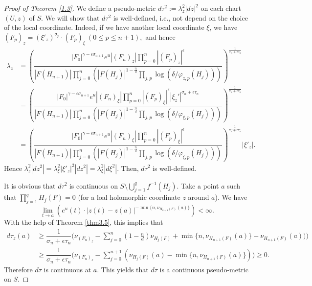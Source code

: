 \documentclass[12pt,article]{amsart}
\numberwithin{equation}{section}
\begin{document}
\begin{proof}[Proof of Theorem \ref{1.3}]
We define a pseudo-metric $d\tau^2:=\lambda_z^2|dz|^2$ on each chart $(U,z)$ of $S$. We will show that $d\tau^2$ is well-defined, i.e., not depend on the choice of the local coordinate. Indeed, if we have another local coordinate $\xi$, we have
$(F_p)_z=(\xi'_z)^{\sigma_p}\cdot (F_p)_\xi\ (0\leq p\le n+1),$ and hence
\begin{align*}
\lambda_{z}&=\left( \dfrac{|F_{0}|^{\gamma-\epsilon\sigma_{n+1}}e^u|(F_n)_z|\prod_{p=0}^{n}|(F_p)_z|^{\epsilon}}{|F(H_{n+1})|\prod_{j=0}^n(|F(H_j)|^{1-\frac{n}{d}}\prod_{j,p}\log (\delta/\varphi_{z,p}(H_j)))}\right )^{\frac{1}{\sigma_n+\epsilon\tau_n}}\\
    &=\left( \dfrac{|F_0|^{\gamma-\epsilon\sigma_{n+1}} e^u|(F_n)_\xi|\prod_{p=0}^{n}|(F_p)_\xi|^{\epsilon}|\xi_z'|^{\sigma_n+\epsilon\tau_n}}{|F(H_{n+1})|\prod_{j=0}^n(|F(H_j)|^{1-\frac{n}{d}}\prod_{j,p}\log (\delta/\varphi_{\xi,p}(H_j)))}\right )^{\frac{1}{\sigma_n+\epsilon\tau_n}}\\
&=\left( \dfrac{|F_0|^{\gamma-\epsilon\sigma_{n+1}}e^u|(F_n)_\xi|\prod_{p=0}^{n}|(F_p)_\xi|^{\epsilon}}{|F(H_{n+1})|\prod_{j=0}^n(|F(H_j)|^{1-\frac{n}{d}}\prod_{j,p}\log (\delta/\varphi_{\xi,p}(H_j)))}\right )^{\frac{1}{\sigma_n+\epsilon\tau_n}}|\xi'_z|.
\end{align*}
Hence $\lambda_z^2|dz^2|=\lambda_\xi^2|\xi'_z|^2|dz^2|=\lambda_\xi^2|d\xi^2|$. Then, $d\tau^2$ is well-defined.

It is obvious that $d\tau^2$ is continuous on $S\setminus\bigcup_{j=1}^q f^{-1}(H_j)$. Take a point $a$ such that $\prod_{j=1}^q H_j(F)=0$ (for a loal holomorphic coordinate $z$ around $a$). We have
$$ \lim_{t\rightarrow a}(e^u(t)\cdot |z(t)-z(a)|^{-\min\{n,\nu_{H_{n+1}(F)}(a)\}})<\infty.$$
With the help of Theorem \ref{thm3.5}, this implies that
\begin{align*}
d\tau_z(a)&\ge\dfrac{1}{\sigma_n+\epsilon\tau_n}\biggl (\nu_{(F_n)_z}-\sum_{j=0}^n(1-\frac{n}{d})\nu_{H_j(F)}+\min\{n,\nu_{H_{n+1}(F)}(a)\}-\nu_{H_{n+1}(F)}(a))\biggl)\\ 
&\ge\dfrac{1}{\sigma_n+\epsilon\tau_n}\biggl (\nu_{(F_n)_z}-\sum_{j=0}^{n+1}(\nu_{H_j(F)}(a)-\min\{n,\nu_{H_{n+1}(F)}(a)\})\biggl) \ge 0.
\end{align*}
Therefore $d\tau$ is continuous at $a$. This yields that $d\tau$ is a continuous pseudo-metric on $S$.


\end{proof}
\end{document}

